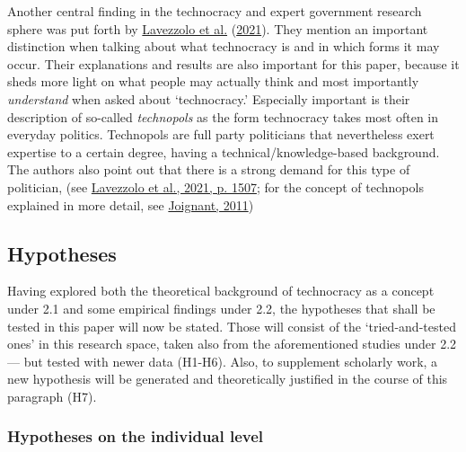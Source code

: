 \documentclass[
  12pt,
  english,
]{article}
\begin{document}
Another central finding in the technocracy and expert government
research sphere was put forth by
\protect\hyperlink{ref-lavezzolo2021will}{Lavezzolo et al.}
(\protect\hyperlink{ref-lavezzolo2021will}{2021}). They mention an
important distinction when talking about what technocracy is and in
which forms it may occur. Their explanations and results are also
important for this paper, because it sheds more light on what people may
actually think and most importantly \emph{understand} when asked about
`technocracy.' Especially important is their description of so-called
\emph{technopols} as the form technocracy takes most often in everyday
politics. Technopols are full party politicians that nevertheless exert
expertise to a certain degree, having a technical/knowledge-based
background. The authors also point out that there is a strong demand for
this type of politician, (see
\protect\hyperlink{ref-lavezzolo2021will}{Lavezzolo et al., 2021, p.
1507}; for the concept of technopols explained in more detail, see
\protect\hyperlink{ref-joignant2011technopols}{Joignant, 2011})

\hypertarget{hypotheses}{%
\subsection{Hypotheses}\label{hypotheses}}

Having explored both the theoretical background of technocracy as a
concept under 2.1 and some empirical findings under 2.2, the hypotheses
that shall be tested in this paper will now be stated. Those will
consist of the `tried-and-tested ones' in this research space, taken
also from the aforementioned studies under 2.2 --- but tested with newer
data (H1-H6). Also, to supplement scholarly work, a new hypothesis will
be generated and theoretically justified in the course of this paragraph
(H7).

\hypertarget{hypotheses-on-the-individual-level}{%
\subsubsection{Hypotheses on the individual
level}\label{hypotheses-on-the-individual-level}}
\end{document}
